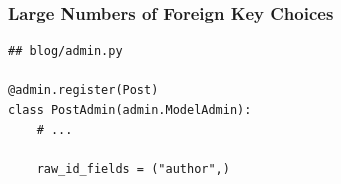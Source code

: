 \documentclass[aspectratio=169]{beamer}
\begin{document}
\begin{frame}
  \begin{figure}[p]
    \centering
  \end{figure}
\end{frame}


\begin{frame}[fragile]
\frametitle{Large Numbers of Foreign Key Choices}

{\tiny
\begin{verbatim}
## blog/admin.py

@admin.register(Post)
class PostAdmin(admin.ModelAdmin):
    # ...

    raw_id_fields = ("author",)
\end{verbatim}
}

\end{frame}


\begin{frame}
  \begin{figure}[p]
    \centering
  \end{figure}
\end{frame}
\end{document}
